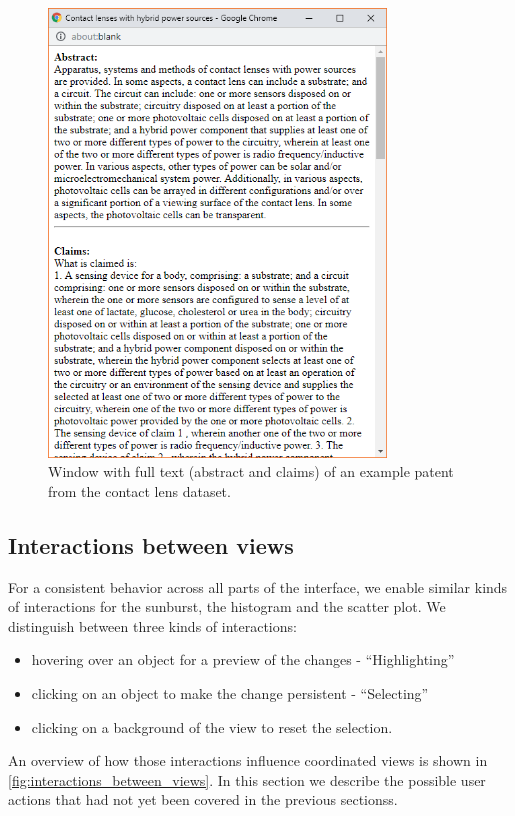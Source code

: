 \begin{figure}[!]
\centering
\includegraphics[width=0.8\textwidth]{img/claims}
\caption{Window with full text (abstract and claims) of an example patent from the contact lens dataset.}
\label{fig:claims}
\end{figure}

\subsection{Interactions between views}
\label{sec:interactions_between_views}

For a consistent behavior across all parts of the interface, we enable similar kinds of interactions for the sunburst, the histogram and the scatter plot.
We distinguish between three kinds of interactions:
\begin{itemize}
\item hovering over an object for a preview of the changes - ``Highlighting''
\item clicking on an object to make the change persistent - ``Selecting''
\item clicking on a background of the view to reset the selection.
\end{itemize}
An overview of how those interactions influence coordinated views is shown in \autoref{fig:interactions_between_views}.
In this section we describe the possible user actions that had not yet been covered in the previous sectionss.

